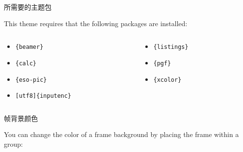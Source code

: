 \documentclass[newPxFont,sthlmFooter]{beamer}
\begin{document}

\begin{frame}[containsverbatim]{所需要的主题包}

This theme requires that the following packages are installed:

\begin{columns}[t]
\begin{column}{0.5\textwidth}
\begin{itemize}
\item \lstinline!{beamer}!
\item \lstinline!{calc}!
\item \lstinline!{eso-pic}!
\item \lstinline![utf8]{inputenc}!
\end{itemize}
\end{column}

\begin{column}{0.5\textwidth}
\begin{itemize}
\item \lstinline!{listings}!
\item \lstinline!{pgf}!
\item \lstinline!{xcolor}!
\end{itemize}
\end{column}
\end{columns}

\end{frame}


\begingroup
{}
\begin{frame}[containsverbatim]{帧背景颜色}

You can change the color of a frame background by placing the frame within a group:

\begin{sthlmLatex}

\begingroup
{}
\begin{frame}
\end{frame}
\endgroup
\end{sthlmLatex}

\end{frame}
\endgroup
\end{document}
